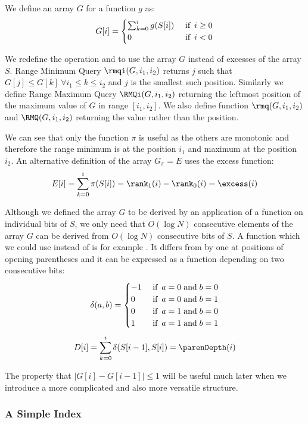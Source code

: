 We define an array $G$ for a function $g$ as:
$$ G[i] = \begin{cases}
	\sum_{k = 0}^i g(S[i]) & \textif i \ge 0 \\
	0 & \textif i < 0
\end{cases} $$
\bigbreak

We redefine the operation \rmqi{} and \RMQi{} to use the array $G$ instead of excesses of the array $S$.
Range Minimum Query $\rmqi(G, i_1, i_2)$ returns $j$ such that $G[j] \le G[k] \ \forall i_1 \le k \le i_2$ and $j$ is the smallest such position.
Similarly we define Range Maximum Query $\RMQi(G, i_1, i_2)$ returning the leftmost position of the maximum value of $G$ in range $[i_1, i_2]$.
We also define function $\rmq(G, i_1, i_2)$ and $\RMQ(G, i_1, i_2)$ returning the value rather than the position.

We can see that only the function $\pi$ is useful as the others are monotonic and therefore the range minimum is at the position $i_1$ and maximum at the position $i_2$.
An alternative definition of the array $G_\pi = E$ uses the excess function:
$$ E[i] = \sum_{k=0}^i \pi(S[i]) = \rank_1(i) - \rank_0(i) = \excess(i) $$

\bigbreak

Although we defined the array $G$ to be derived by an application of a function on individual bits of $S$, we only need that $O(\log N)$ consecutive elements of the array $G$ can be derived from $O(\log N)$ consecutive bits of $S$.
A function which we could use instead of \excess{} is for example \parenDepth{}.
It differs from \excess{} by one at positions of opening parentheses and it can be expressed as a function depending on two consecutive bits:
$$\delta(a, b) = 
\begin{cases}
-1 &\textif a = 0 \booland b = 0 \\
0 &\textif a = 0 \booland b = 1 \\
0 &\textif a = 1 \booland b = 0 \\
1 &\textif a = 1 \booland b = 1
\end{cases}$$
$$ D[i] = \sum_{k=0}^i \delta(S[i - 1], S[i]) = \parenDepth(i) $$

The property that $| G[i] - G[i-1] | \le 1$ will be useful much later when we introduce a more complicated and also more versatile structure.

\subsubsection{A Simple Index}\label{sss:rmq-index}

